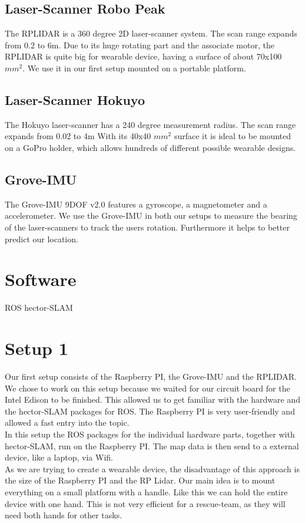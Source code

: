 \documentclass{sigchi-ext}
\begin{document}
\subsection{Laser-Scanner Robo Peak}
The RPLIDAR is a 360 degree 2D laser-scanner system. The scan range expands from 0.2 to 6m. Due to its huge rotating part and the associate motor, the RPLIDAR is quite big for wearable device, having a surface of about 70x100 $mm^2$. We use it in our first setup mounted on a portable platform.
\subsection{Laser-Scanner Hokuyo}
The Hokuyo laser-scanner has a 240 degree measurement radius. The scan range expands from 0.02 to 4m With its 40x40 $mm^2$ surface it is ideal to be mounted on a GoPro holder, which allows hundreds of different possible wearable designs.
\subsection{Grove-IMU}
The Grove-IMU 9DOF v2.0 features a gyroscope, a magnetometer and a accelerometer. We use the Grove-IMU in both our setups to measure the bearing of the laser-scanners to track the users rotation. Furthermore it helps to better predict our location.
\section{Software}
ROS hector-SLAM
\section{Setup 1}
Our first setup consists of the Raspberry PI, the Grove-IMU and the RPLIDAR. We chose to work on this setup because we waited for our circuit board for the Intel Edison to be finished. This allowed us to get familiar with the hardware and the hector-SLAM packages for ROS. The Raspberry PI is very user-friendly and allowed a fast entry into the topic.\\
In this setup the ROS packages for the individual hardware parts, together with hector-SLAM, run on the Raspberry PI. The map data is then send to a external device, like a laptop, via Wifi.\\ 
As we are trying to create a wearable device, the disadvantage of this approach is the size of the Raspberry PI and the RP Lidar. Our main idea is to mount everything on a small platform with a handle. Like this we can hold the entire device with one hand. This is not very efficient for a rescue-team, as they will need both hands for other tasks.
\end{document}
